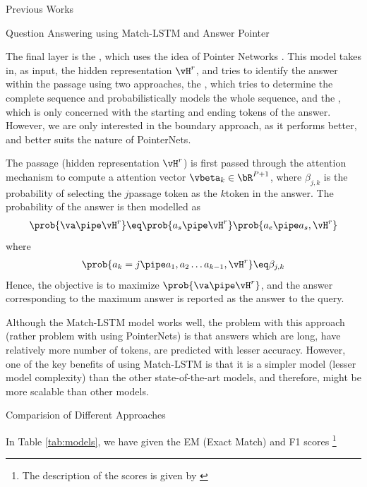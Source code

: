 \documentclass{article}
\begin{document}
\begin{psection}{Previous Works}
\begin{psubsection}{Question Answering using Match-LSTM and Answer Pointer}
\begin{enumerate}[label=\bt{\theenumi.}]
				The final layer is the , which uses the idea of Pointer Networks \cite{pointernet}.
				This model takes in, as input, the hidden representation $\vH^r$, and tries to identify the answer within the passage using two approaches, the , which tries to determine the complete sequence and probabilistically models the whole sequence, and the , which is only concerned with the starting and ending tokens of the answer. However, we are only interested in the boundary approach, as it performs better, and better suits the nature of PointerNets.

				The passage (hidden representation $\vH^r$) is first passed through the attention mechanism to compute a attention vector $\vbeta_k \in \bR^{P + 1}$, where $\beta_{j, k}$ is the probability of selecting the $j$\tth passage token as the $k$\tth token in the answer. The probability of the answer is then modelled as
				\begin{align*}
					\prob{\va \pipe \vH^r}	\eq	\prob{a_s \pipe \vH^r} \prob{a_e \pipe a_s, \vH^r}
				\end{align*}
				where
				\begin{align*}
					\prob{a_k = j \pipe a_1, a_2 \dots a_{k - 1}, \vH^r}	\eq	\beta_{j, k}
				\end{align*}
				Hence, the objective is to maximize $\prob{\va \pipe \vH^r}$, and the answer corresponding to the maximum answer is reported as the answer to the query.
		\end{enumerate}

		Although the Match-LSTM model works well, the problem with this approach (rather problem with using PointerNets) is that answers which are long, \ie have relatively more number of tokens, are predicted with lesser accuracy. However, one of the key benefits of using Match-LSTM is that it is a simpler model (lesser model complexity) than the other state-of-the-art models, and therefore, might be more scalable than other models.

	\end{psubsection}

	\begin{psubsection}{Comparision of Different Approaches}

		In Table \ref{tab:models}, we have given the EM (Exact Match) and F1 scores \footnote{The description of the scores is given by \cite{squad}}


\end{psubsection}
\end{psection}
\end{document}
